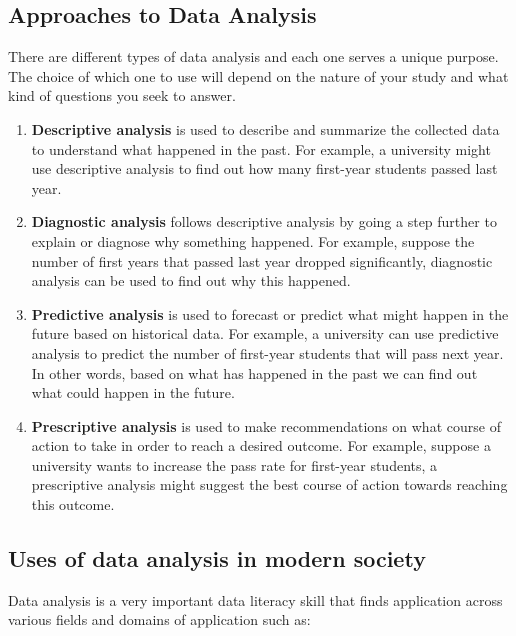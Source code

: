 \documentclass[
]{book}
\providecommand{\tightlist}{%
  \setlength{\itemsep}{0pt}\setlength{\parskip}{0pt}}
\begin{document}
\subsection{Approaches to Data Analysis}\label{approaches-to-data-analysis}

There are different types of data analysis and each one serves a unique purpose. The choice of which one to use will depend on the nature of your study and what kind of questions you seek to answer.

\begin{enumerate}
\def\labelenumi{\arabic{enumi}.}
\tightlist
\item
  \textbf{Descriptive analysis} is used to describe and summarize the collected data to understand what happened in the past. For example, a university might use descriptive analysis to find out how many first-year students passed last year.
\item
  \textbf{Diagnostic analysis} follows descriptive analysis by going a step further to explain or diagnose why something happened. For example, suppose the number of first years that passed last year dropped significantly, diagnostic analysis can be used to find out why this happened.
\item
  \textbf{Predictive analysis} is used to forecast or predict what might happen in the future based on historical data. For example, a university can use predictive analysis to predict the number of first-year students that will pass next year. In other words, based on what has happened in the past we can find out what could happen in the future.
\item
  \textbf{Prescriptive analysis} is used to make recommendations on what course of action to take in order to reach a desired outcome. For example, suppose a university wants to increase the pass rate for first-year students, a prescriptive analysis might suggest the best course of action towards reaching this outcome.
\end{enumerate}

\subsection{Uses of data analysis in modern society}\label{uses-of-data-analysis-in-modern-society}

Data analysis is a very important data literacy skill that finds application across various fields and domains of application such as:
\end{document}
